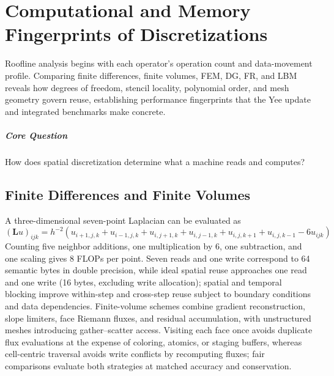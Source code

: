 \chapter{Computational and Memory Fingerprints of Discretizations}\label{v0ch:23}
\begin{chaptersummary}
Roofline analysis begins with each operator's operation count and data-movement profile. Comparing finite differences, finite volumes, FEM, DG, FR, and LBM reveals how degrees of freedom, stencil locality, polynomial order, and mesh geometry govern reuse, establishing performance fingerprints that the Yee update and integrated benchmarks make concrete.
\end{chaptersummary}
\paragraph{Core Question}How does spatial discretization determine what a machine reads and computes?

\section{Finite Differences and Finite Volumes}
A three-dimensional seven-point Laplacian can be evaluated as
\[
 (\bm L u)_{ijk}
 =h^{-2}(u_{i+1,j,k}+u_{i-1,j,k}+u_{i,j+1,k}
 +u_{i,j-1,k}+u_{i,j,k+1}+u_{i,j,k-1}-6u_{ijk})
\]
Counting five neighbor additions, one multiplication by 6, one subtraction, and one scaling gives 8 FLOPs per point. Seven reads and one write correspond to 64 semantic bytes in double precision, while ideal spatial reuse approaches one read and one write (16 bytes, excluding write allocation); spatial and temporal blocking improve within-step and cross-step reuse subject to boundary conditions and data dependencies.
Finite-volume schemes combine gradient reconstruction, slope limiters, face Riemann fluxes, and residual accumulation, with unstructured meshes introducing gather--scatter access. Visiting each face once avoids duplicate flux evaluations at the expense of coloring, atomics, or staging buffers, whereas cell-centric traversal avoids write conflicts by recomputing fluxes; fair comparisons evaluate both strategies at matched accuracy and conservation.
